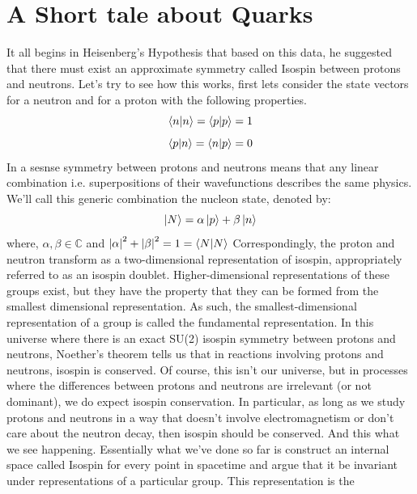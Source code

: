 \documentclass[]{article}
\begin{document}
\section{A Short tale about Quarks}
It all begins in Heisenberg's Hypothesis that based on this data,
he suggested that there must exist an approximate symmetry called Isospin between protons and neutrons. Let's try to see how this works, first lets consider the state vectors for a neutron and for a proton with the following properties.
\begin{equation}
\braket{n}{n} = \braket{p}{p} = 1
\end{equation}
\begin{equation}
\braket{p}{n} = \braket{n}{p} = 0
\end{equation}
In a sesnse symmetry between protons and neutrons means that any linear combination i.e. superpositions of their wavefunctions describes the same physics. We'll call this generic combination the nucleon state, denoted by:
\begin{equation}
\ket{N} = \alpha \ket{p} +  \beta \ket{n}
\end{equation}
where, $\alpha, \beta \in \mathbb{C}$ and $\abs{\alpha}^{2} + \abs{\beta}^{2} = 1 = \braket{N}{N}$
Correspondingly, the proton and neutron transform as a two-dimensional representation of isospin, appropriately referred to as an isospin doublet. Higher-dimensional representations of these groups exist, but they have the property that they can be formed from the smallest dimensional representation. As such, the smallest-dimensional representation of a group is called the fundamental representation.
In this universe where there is an exact SU(2) isospin symmetry between protons and neutrons, Noether’s theorem tells us that in reactions involving protons and neutrons, isospin is conserved. Of course, this isn’t our universe, but in processes where the differences between protons and neutrons are irrelevant (or not dominant), we do expect isospin conservation. In particular,
as long as we study protons and neutrons in a way that doesn’t involve electromagnetism or don’t care about the neutron decay, then isospin should be conserved. And this what we see happening. Essentially what we've done so far is construct an internal space called Isospin for every point in spacetime and argue that it be invariant under representations of a particular group. This representation is the 
\end{document}
